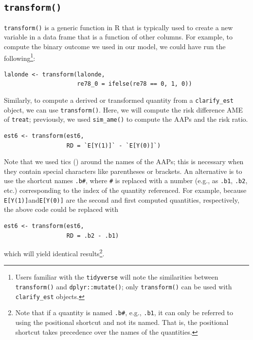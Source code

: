 \hypertarget{transform}{%
\subsection{\texorpdfstring{\texttt{transform()}}{transform()}}\label{transform}}

\texttt{transform()} is a generic function in R that is typically used to create a new variable in a data frame that is a function of other columns. For example, to compute the binary outcome we used in our model, we could have run the following\footnote{Users familiar with the \texttt{tidyverse} will note the similarities between \texttt{transform()} and \texttt{dplyr::mutate()}; only \texttt{transform()} can be used with \texttt{clarify\_est} objects.}:

\begin{verbatim}
lalonde <- transform(lalonde,
                     re78_0 = ifelse(re78 == 0, 1, 0))
\end{verbatim}

Similarly, to compute a derived or transformed quantity from a \texttt{clarify\_est} object, we can use \texttt{transform()}. Here, we will compute the risk difference AME of \texttt{treat}; previously, we used \texttt{sim\_ame()} to compute the AAPs and the risk ratio.

\begin{verbatim}
est6 <- transform(est6,
                  RD = `E[Y(1)]` - `E[Y(0)]`)
\end{verbatim}

Note that we used tics (\texttt{\textasciigrave{}}) around the names of the AAPs; this is necessary when they contain special characters like parentheses or brackets. An alternative is to use the shortcut names \texttt{.b\#}, where \texttt{\#} is replaced with a number (e.g., as \texttt{.b1}, \texttt{.b2}, etc.) corresponding to the index of the quantity referenced. For example, because \texttt{E{[}Y(1){]}}and\texttt{E{[}Y(0){]}} are the second and first computed quantities, respectively, the above code could be replaced with

\begin{verbatim}
est6 <- transform(est6,
                  RD = .b2 - .b1)
\end{verbatim}

which will yield identical results\footnote{Note that if a quantity is named \texttt{.b\#}, e.g., \texttt{.b1}, it can only be referred to using the positional shortcut and not its named. That is, the positional shortcut takes precedence over the names of the quantities.}.

